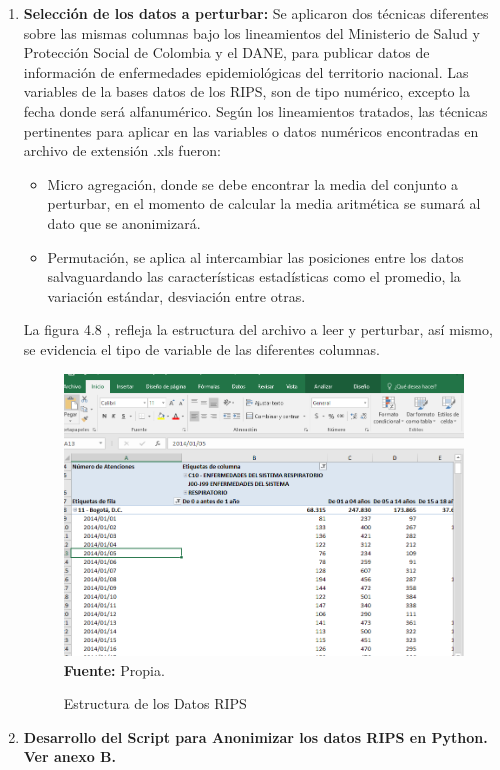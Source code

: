 \documentclass[a4paper,openright,12pt]{book}
\theoremstyle{definition}
\theoremstyle{remark}
\begin{document}
\begin{enumerate}
	\item \textbf{Selección de los datos a perturbar:} Se aplicaron dos técnicas diferentes sobre las mismas columnas bajo los lineamientos del Ministerio de Salud y Protección Social de Colombia y el DANE, para publicar datos de información de enfermedades epidemiológicas del territorio nacional. Las variables de la bases datos de los RIPS, son de tipo numérico, excepto la fecha donde será alfanumérico. Según los lineamientos tratados, las técnicas pertinentes para aplicar en las variables o datos numéricos encontradas en archivo de extensión .xls fueron:
    \begin{itemize}
    	\item Micro agregación, donde se debe encontrar la media del conjunto a perturbar, en el momento de calcular la media aritmética se sumará al dato que se anonimizará.
        \item Permutación, se aplica al intercambiar las posiciones entre los datos salvaguardando las características estadísticas como el promedio, la variación estándar, desviación entre otras.
    \end{itemize}
La figura 4.8 , refleja la estructura del archivo a leer y perturbar, así mismo, se evidencia el tipo de variable de las diferentes columnas.
  \begin{figure}[!ht]
\centering
\caption{Estructura de los Datos RIPS} 
 \includegraphics[scale=0.46]{Datos_Rips}
\label{fig:Datos_Rips}
\\ \textbf{Fuente:} Propia.
\end{figure}    
    \item \textbf{Desarrollo del Script para Anonimizar los datos RIPS en Python. Ver anexo B.}

\end{enumerate}
\end{document}
